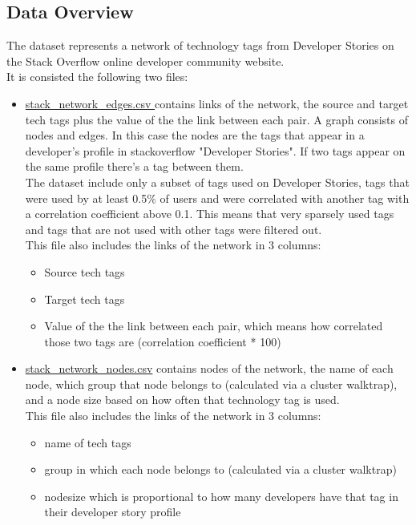 \documentclass[12pt]{article}
\begin{document}
	\subsection{Data Overview}
		The dataset represents a network of technology tags from Developer Stories on the Stack Overflow online developer community website.\\
		It is consisted the following two files:
		\begin{itemize}
			\item \underline{stack\_network\_edges.csv } contains links of the network, the source and target tech tags plus the value of the the link between each pair. A graph consists of nodes and edges. In this case the nodes are the tags that appear in a developer's profile in stackoverflow "Developer Stories". If two tags appear on the same profile there's a tag between them. \\
			The dataset include only a subset of tags used on Developer Stories, tags that were used by at least 0.5\% of users and were correlated with another tag with a correlation coefficient above 0.1. This means that very sparsely used tags and tags that are not used with other tags were filtered out.\\
			This file also includes the links of the network in 3 columns: 
			\begin{itemize}
				\item Source tech tags 
				\item Target tech tags 
				\item Value of the the link between each pair, which means how correlated those two tags are (correlation coefficient * 100)
			\end{itemize}
			\item \underline{stack\_network\_nodes.csv} contains nodes of the network, the name of each node, which group that node belongs to (calculated via a cluster walktrap), and a node size based on how often that technology tag is used.\\
			This file also includes the links of the network in 3 columns: 
			\begin{itemize}
				\item name of tech tags 
				\item group in which each node belongs to (calculated via a cluster walktrap)
				\item nodesize which is proportional to how many developers have that tag in their developer story profile
			\end{itemize}
		\end{itemize}
	
\end{document}

